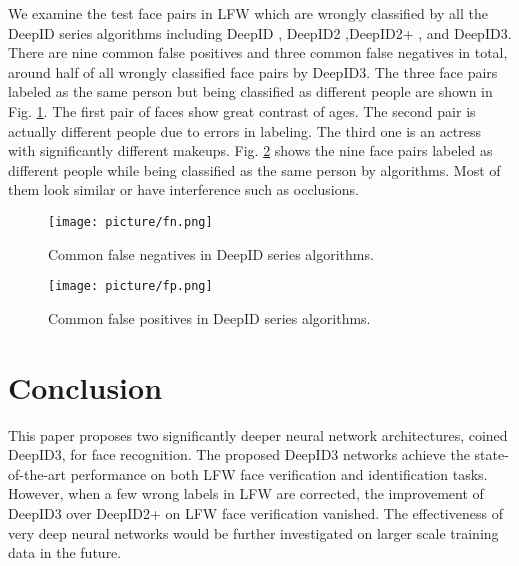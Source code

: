 \documentclass[10pt,twocolumn,letterpaper]{article}
\begin{document}
We examine the test face pairs in LFW which are wrongly classified by all the DeepID series algorithms including DeepID \cite{sun2014a}, DeepID2 \cite{sun2014b,sun2014b2},DeepID2+ \cite{sun2014c}, and DeepID3. There are nine common false positives and three common false negatives in total, around half of all wrongly classified face pairs by DeepID3. The three face pairs labeled as the same person but being classified as different people are shown in Fig. \ref{fig:fn}. The first pair of faces show great contrast of ages. The second pair is actually different people due to errors in labeling. The third one is an actress with significantly different makeups. Fig. \ref{fig:fp} shows the nine face pairs labeled as different people while being classified as the same person by algorithms. Most of them look similar or have interference such as occlusions.

\begin{figure}[!h]
\begin{center}
\texttt{[image: picture/fn.png]}
\end{center}
\caption{Common false negatives in DeepID series algorithms.}
\label{fig:fn}
\end{figure}

\begin{figure}[!h]
\begin{center}
\texttt{[image: picture/fp.png]}
\end{center}
\caption{Common false positives in DeepID series algorithms.}
\label{fig:fp}
\end{figure}




\section{Conclusion}

This paper proposes two significantly deeper neural network architectures, coined DeepID3, for face recognition. The proposed DeepID3 networks achieve the state-of-the-art performance on both LFW face verification and identification tasks. However, when a few wrong labels in LFW are corrected, the improvement of DeepID3 over DeepID2+ on LFW face verification vanished. The effectiveness of very deep neural networks would be further investigated on larger scale training data in the future.

{\small


}
\end{document}
